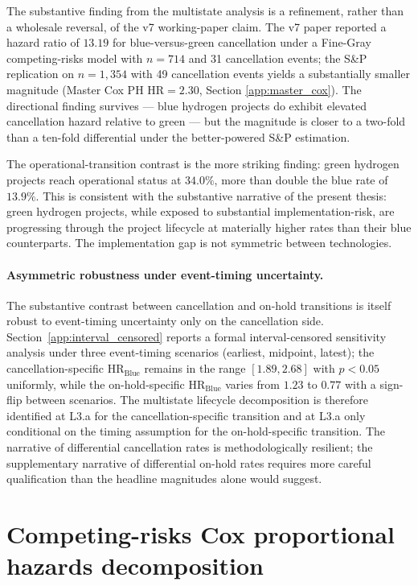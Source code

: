 The substantive finding from the multistate analysis is a refinement, rather than a wholesale reversal, of the v7 working-paper claim. The v7 paper reported a hazard ratio of $13.19$ for blue-versus-green cancellation under a Fine-Gray competing-risks model with $n = 714$ and 31 cancellation events; the S\&P replication on $n = 1{,}354$ with 49 cancellation events yields a substantially smaller magnitude (Master Cox PH $\text{HR} = 2.30$, Section \ref{app:master_cox}). The directional finding survives --- blue hydrogen projects do exhibit elevated cancellation hazard relative to green --- but the magnitude is closer to a two-fold than a ten-fold differential under the better-powered S\&P estimation.

The operational-transition contrast is the more striking finding: green hydrogen projects reach operational status at $34.0\%$, more than double the blue rate of $13.9\%$. This is consistent with the substantive narrative of the present thesis: green hydrogen projects, while exposed to substantial implementation-risk, are progressing through the project lifecycle at materially higher rates than their blue counterparts. The implementation gap is not symmetric between technologies.

\paragraph{Asymmetric robustness under event-timing uncertainty.}
The substantive contrast between cancellation and on-hold transitions is itself robust to event-timing uncertainty only on the cancellation side. Section~\ref{app:interval_censored} reports a formal interval-censored sensitivity analysis under three event-timing scenarios (earliest, midpoint, latest); the cancellation-specific $\text{HR}_{\text{Blue}}$ remains in the range $[1.89, 2.68]$ with $p < 0.05$ uniformly, while the on-hold-specific $\text{HR}_{\text{Blue}}$ varies from $1.23$ to $0.77$ with a sign-flip between scenarios. The multistate lifecycle decomposition is therefore identified at L3.a for the cancellation-specific transition and at L3.a only conditional on the timing assumption for the on-hold-specific transition. The narrative of differential cancellation rates is methodologically resilient; the supplementary narrative of differential on-hold rates requires more careful qualification than the headline magnitudes alone would suggest.

\section{Competing-risks Cox proportional hazards decomposition}
\label{app:competing_risks}

